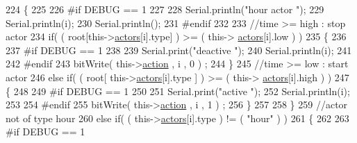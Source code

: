 \begin{DoxyCode}
224                     \{
225                     
226 \textcolor{preprocessor}{                    #if DEBUG == 1}
227                         
228                         Serial.println(\textcolor{stringliteral}{"hour actor "});
229                         Serial.println(i);
230                         Serial.println();
231 \textcolor{preprocessor}{                    #endif}
232 
233                         \textcolor{comment}{//time >= high : stop actor}
234                         \textcolor{keywordflow}{if}( ( root[this->\hyperlink{classJetpack_a7e16d2f97837f9712a2e6de1c50d99db}{actors}[i].type] ) >= ( this->
      \hyperlink{classJetpack_a7e16d2f97837f9712a2e6de1c50d99db}{actors}[i].low ) )     
235                         \{
236                         
237 \textcolor{preprocessor}{                        #if DEBUG == 1 }
238                             
239                             Serial.print(\textcolor{stringliteral}{"deactive "});
240                             Serial.println(i);
241                         
242 \textcolor{preprocessor}{                        #endif  }
243                             bitWrite( this->\hyperlink{classJetpack_aca3142925a7b0834b34ae91d26af7765}{action} , i , 0 ) ;    
244                         \}
245                         \textcolor{comment}{//time >= low : start actor}
246                         \textcolor{keywordflow}{else} \textcolor{keywordflow}{if}( ( root[ this->\hyperlink{classJetpack_a7e16d2f97837f9712a2e6de1c50d99db}{actors}[i].type ] ) >= ( this->
      \hyperlink{classJetpack_a7e16d2f97837f9712a2e6de1c50d99db}{actors}[i].high ) )
247                         \{
248                         
249 \textcolor{preprocessor}{                        #if DEBUG == 1 }
250                         
251                             Serial.print(\textcolor{stringliteral}{"active "});
252                             Serial.println(i);
253                         
254 \textcolor{preprocessor}{                        #endif}
255                             bitWrite( this->\hyperlink{classJetpack_aca3142925a7b0834b34ae91d26af7765}{action} , i , 1 ) ;                    
256                         \}
257                         
258                     \}
259                     \textcolor{comment}{//actor not of type hour}
260                     \textcolor{keywordflow}{else} \textcolor{keywordflow}{if}( ( this->\hyperlink{classJetpack_a7e16d2f97837f9712a2e6de1c50d99db}{actors}[i].type ) != ( \textcolor{stringliteral}{"hour"} ) )      
261                     \{
262                     
263 \textcolor{preprocessor}{                    #if DEBUG == 1 }

\end{DoxyCode}
